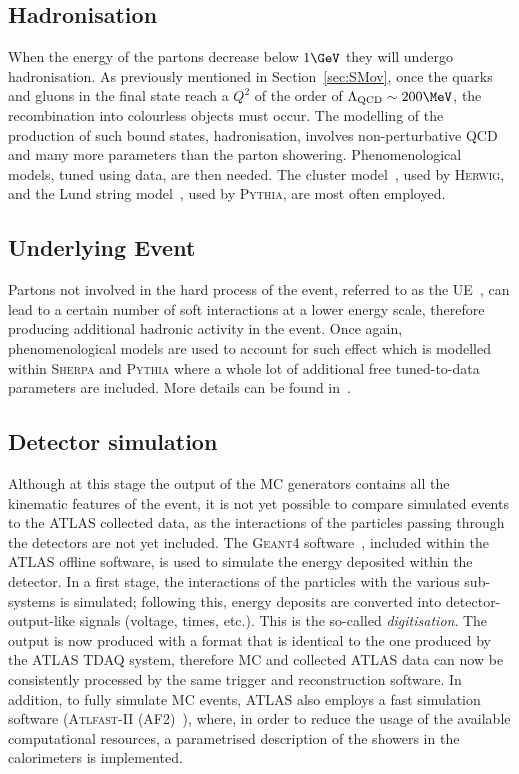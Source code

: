 		\subsection*{Hadronisation}

			When the energy of the partons decrease below $1 \GeV$ they will undergo hadronisation. As previously mentioned in Section~\ref{sec:SMov}, once the quarks and gluons in the final state reach a $Q^2$ of the order of $\Lambda_{\mathrm{QCD}} \sim 200 \MeV$, the recombination into colourless objects must occur. The modelling of the production of such bound states, hadronisation, involves non-perturbative \ac{QCD} and many more parameters than the parton showering. Phenomenological models, tuned using data, are then needed. The cluster model~\cite{ClusterHerwig1999}, used by \textsc{Herwig}, and the Lund string model~\cite{LundModel2002}, used by \textsc{Pythia}, are most often employed. 

		\subsection*{Underlying Event}

			Partons not involved in the hard process of the event, referred to as the \ac{UE}~\cite{Field2008}, can lead to a certain number of soft interactions at a lower energy scale, therefore producing additional hadronic activity in the event. Once again, phenomenological models are used to account for such effect which is modelled within \textsc{Sherpa} and \textsc{Pythia} where a whole lot of additional free tuned-to-data parameters are included. More details can be found in~\cite{Field2008}.

		\subsection*{Detector simulation}
		\label{subsec:detSim}

			Although at this stage the output of the \ac{MC} generators contains all the kinematic features of the event, it is not yet possible to compare simulated events to the \ac{ATLAS} collected data, as the interactions of the particles passing through the detectors are not yet included. The \textsc{Geant4} software~\cite{Geant42003}, included within the \ac{ATLAS} offline software, is used to simulate the energy deposited within the detector. In a first stage, the interactions of the particles with the various sub-systems is simulated; following this, energy deposits are converted into detector-output-like signals (voltage, times, etc.). This is the so-called \emph{digitisation}. The output is now produced with a format that is identical to the one produced by the \ac{ATLAS} \acl{TDAQ} system, therefore \ac{MC} and collected \ac{ATLAS} data can now be consistently processed by the same trigger and reconstruction software. In addition, to fully simulate \ac{MC} events, \ac{ATLAS}	also employs a fast simulation software (\textsc{Atlfast-II} (AF2)~\cite{Lukas2012}), where, in order to reduce the usage of the available computational resources, a parametrised description of the showers in the calorimeters is implemented. 


